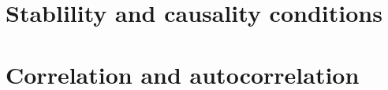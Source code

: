 \documentclass[../../main/main.tex]{subfiles}
\begin{document}

\section{Stablility and causality conditions}





\section{Correlation and autocorrelation}
\end{document}
